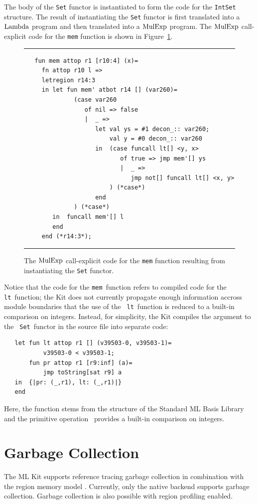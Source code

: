 \documentclass[12pt]{book}
\begin{document}
The body of the {\tt Set} functor is instantiated to form the code for
the {\tt IntSet} structure. The result of instantiating the {\tt Set}
functor is first translated into a $\hbox{\rm Lambda}$ program and then translated
into a $\hbox{\rm MulExp}$ program. The $\hbox{\rm MulExp}$ call-explicit code for the
{\tt mem} function is shown in Figure~\ref{set_inst_mulexp.fig}.
\begin{figure}[ht]
\hrule \medskip
\begin{verbatim}
   fun mem attop r1 [r10:4] (x)= 
     fn attop r10 l => 
     letregion r14:3 
     in let fun mem' atbot r14 [] (var260)= 
              (case var260 
                 of nil => false
                 |  _ => 
                    let val ys = #1 decon_:: var260; 
                        val y = #0 decon_:: var260
                    in  (case funcall lt[] <y, x> 
                           of true => jmp mem'[] ys
                           |  _ => 
                              jmp not[] funcall lt[] <x, y>
                        ) (*case*) 
                    end 
              ) (*case*) 
        in  funcall mem'[] l
        end  
     end (*r14:3*); 
\end{verbatim}
\caption{The $\hbox{\rm MulExp}$ call-explicit code for the {\tt mem} 
  function resulting from instantiating the {\tt Set} functor.}
\medskip \hrule
\label{set_inst_mulexp.fig}
\end{figure}

Notice that the code for the {\tt mem}~function refers to compiled
code for the {\tt lt}~function; the Kit does not currently propagate
enough information accross module boundaries that the use of the {\tt
  lt}~function is reduced to a built-in comparison on integers.
Instead, for simplicity, the Kit compiles the argument to the {\tt
  Set}~functor in the source file  into separate
code:
\begin{verbatim}
   let fun lt attop r1 [] (v39503-0, v39503-1)= 
           v39503-0 < v39503-1; 
       fun pr attop r1 [r9:inf] (a)= 
           jmp toString[sat r9] a
   in  {|pr: (_,r1), lt: (_,r1)|}
   end 
\end{verbatim}
Here, the  function stems from the 
structure of the Standard ML Basis Library and the primitive
operation~\boxml{<} provides a built-in comparison on integers.

\chapter{Garbage Collection}
\label{gc.chap}
The ML Kit supports reference tracing garbage collection in
combination with the region memory model \cite{hallenberg99}.
Currently, only the native backend supports garbage collection.
Garbage collection is also possible with region profiling enabled.
\end{document}
